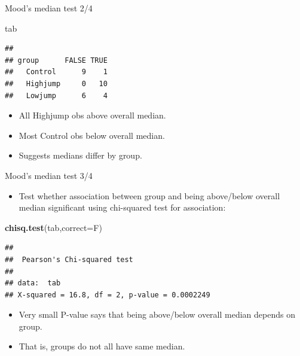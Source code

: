 \documentclass[ignorenonframetext,]{beamer}
\newenvironment{Shaded}{\begin{snugshade}}{\end{snugshade}}
\newcommand{\DataTypeTok}[1]{\textcolor[rgb]{0.13,0.29,0.53}{#1}}
\newcommand{\KeywordTok}[1]{\textcolor[rgb]{0.13,0.29,0.53}{\textbf{#1}}}
\newcommand{\NormalTok}[1]{#1}
\providecommand{\tightlist}{%
  \setlength{\itemsep}{0pt}\setlength{\parskip}{0pt}}
\begin{document}
\begin{frame}[fragile]{Mood's median test 2/4}
\protect\hypertarget{moods-median-test-24}{}

\begin{Shaded}
\begin{Highlighting}[]
\NormalTok{tab}
\end{Highlighting}
\end{Shaded}

\begin{verbatim}
##           
## group      FALSE TRUE
##   Control      9    1
##   Highjump     0   10
##   Lowjump      6    4
\end{verbatim}

\begin{itemize}
\tightlist
\item
  All Highjump obs above overall median.
\item
  Most Control obs below overall median.
\item
  Suggests medians differ by group.
\end{itemize}

\end{frame}

\begin{frame}[fragile]{Mood's median test 3/4}
\protect\hypertarget{moods-median-test-34}{}

\begin{itemize}
\tightlist
\item
  Test whether association between group and being above/below overall
  median significant using chi-squared test for association:
\end{itemize}

\begin{Shaded}
\begin{Highlighting}[]
\KeywordTok{chisq.test}\NormalTok{(tab,}\DataTypeTok{correct=}\NormalTok{F)}
\end{Highlighting}
\end{Shaded}

\begin{verbatim}
## 
##  Pearson's Chi-squared test
## 
## data:  tab
## X-squared = 16.8, df = 2, p-value = 0.0002249
\end{verbatim}

\begin{itemize}
\tightlist
\item
  Very small P-value says that being above/below overall median depends
  on group.
\item
  That is, groups do not all have same median.
\end{itemize}

\end{frame}
\end{document}

